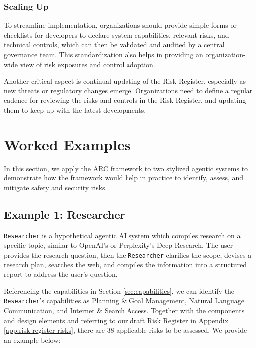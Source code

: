 \documentclass{article}
\begin{document}
\subsubsection{Scaling Up}

To streamline implementation, organizations should provide simple forms or checklists for developers to declare system capabilities, relevant risks, and technical controls, which can then be validated and audited by a central governance team. This standardization also helps in providing an organization-wide view of risk exposures and control adoption. 

Another critical aspect is continual updating of the Risk Register, especially as new threats or regulatory changes emerge. Organizations need to define a regular cadence for reviewing the risks and controls in the Risk Register, and updating them to keep up with the latest developments.

\section{Worked Examples}

In this section, we apply the ARC framework to two stylized agentic systems to demonstrate how the framework would help in practice to identify, assess, and mitigate safety and security risks.

\subsection{Example 1: Researcher}

\texttt{Researcher} is a hypothetical agentic AI system which compiles research on a specific topic, similar to OpenAI's or Perplexity's Deep Research. The user provides the research question, then the \texttt{Researcher} clarifies the scope, devises a research plan, searches the web, and compiles the information into a structured report to address the user's question.

Referencing the capabilities in Section \ref{sec:capabilities}, we can identify the \texttt{Researcher}'s capabilities as Planning \& Goal Management, Natural Language Communication, and Internet \& Search Access. Together with the components and design elements and referring to our draft Risk Register in Appendix \ref{app:risk-register-risks}, there are 38 applicable risks to be assessed. We provide an example below:
\end{document}
